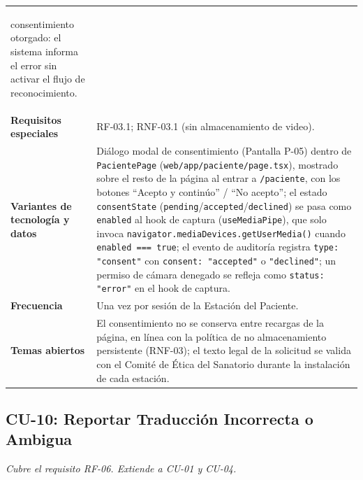 \begin{longtable}{@{}>{\raggedright\arraybackslash}p{4.1cm} >{\raggedright\arraybackslash}p{\dimexpr\textwidth-4.1cm-2\tabcolsep\relax}@{}}
\begin{itemize}[leftmargin=*, itemsep=2pt]
    consentimiento otorgado: el sistema informa el error sin activar el
    flujo de reconocimiento.
\end{itemize} \\
\textbf{Requisitos especiales} & RF-03.1; RNF-03.1 (sin almacenamiento de video). \\
\textbf{Variantes de tecnología y datos} &
Diálogo modal de consentimiento (Pantalla P-05) dentro de
\texttt{PacientePage} (\texttt{web/app/paciente/page.tsx}), mostrado
sobre el resto de la página al entrar a \texttt{/paciente}, con los
botones ``Acepto y continúo'' / ``No acepto''; el estado
\texttt{consentState} (\texttt{pending}/\texttt{accepted}/\texttt{declined})
se pasa como \texttt{enabled} al hook de captura (\texttt{useMediaPipe}),
que solo invoca \texttt{navigator.mediaDevices.getUserMedia()} cuando
\texttt{enabled === true}; el evento de auditoría registra
\texttt{type: "consent"} con \texttt{consent: "accepted"} o
\texttt{"declined"}; un permiso de cámara denegado se refleja como
\texttt{status: "error"} en el hook de captura. \\
\textbf{Frecuencia} & Una vez por sesión de la Estación del Paciente. \\
\textbf{Temas abiertos} &
El consentimiento no se conserva entre recargas de la página, en línea
con la política de no almacenamiento persistente (RNF-03); el texto legal
de la solicitud se valida con el Comité de Ética del Sanatorio durante la
instalación de cada estación. \\
\bottomrule
\end{longtable}

\subsection{CU-10: Reportar Traducción Incorrecta o Ambigua}
\textit{Cubre el requisito RF-06. Extiende a CU-01 y CU-04.}

